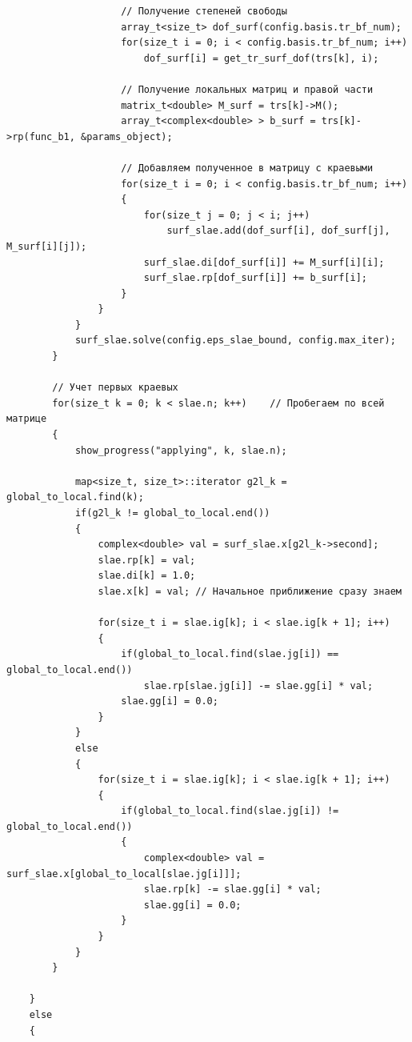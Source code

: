 \documentclass[a4paper,12pt]{article}
\begin{document}
\begin{singlespace}
\begin{tiny}
\begin{verbatim}
                    // Получение степеней свободы
                    array_t<size_t> dof_surf(config.basis.tr_bf_num);
                    for(size_t i = 0; i < config.basis.tr_bf_num; i++)
                        dof_surf[i] = get_tr_surf_dof(trs[k], i);

                    // Получение локальных матриц и правой части
                    matrix_t<double> M_surf = trs[k]->M();
                    array_t<complex<double> > b_surf = trs[k]->rp(func_b1, &params_object);

                    // Добавляем полученное в матрицу с краевыми
                    for(size_t i = 0; i < config.basis.tr_bf_num; i++)
                    {
                        for(size_t j = 0; j < i; j++)
                            surf_slae.add(dof_surf[i], dof_surf[j], M_surf[i][j]);
                        surf_slae.di[dof_surf[i]] += M_surf[i][i];
                        surf_slae.rp[dof_surf[i]] += b_surf[i];
                    }
                }
            }
            surf_slae.solve(config.eps_slae_bound, config.max_iter);
        }

        // Учет первых краевых
        for(size_t k = 0; k < slae.n; k++) 	  // Пробегаем по всей матрице
        {
            show_progress("applying", k, slae.n);

            map<size_t, size_t>::iterator g2l_k = global_to_local.find(k);
            if(g2l_k != global_to_local.end())
            {
                complex<double> val = surf_slae.x[g2l_k->second];
                slae.rp[k] = val;
                slae.di[k] = 1.0;
                slae.x[k] = val; // Начальное приближение сразу знаем

                for(size_t i = slae.ig[k]; i < slae.ig[k + 1]; i++)
                {
                    if(global_to_local.find(slae.jg[i]) == global_to_local.end())
                        slae.rp[slae.jg[i]] -= slae.gg[i] * val;
                    slae.gg[i] = 0.0;
                }
            }
            else
            {
                for(size_t i = slae.ig[k]; i < slae.ig[k + 1]; i++)
                {
                    if(global_to_local.find(slae.jg[i]) != global_to_local.end())
                    {
                        complex<double> val = surf_slae.x[global_to_local[slae.jg[i]]];
                        slae.rp[k] -= slae.gg[i] * val;
                        slae.gg[i] = 0.0;
                    }
                }
            }
        }

    }
    else
    {


\end{verbatim}
\end{tiny}
\end{singlespace}
\end{document}
